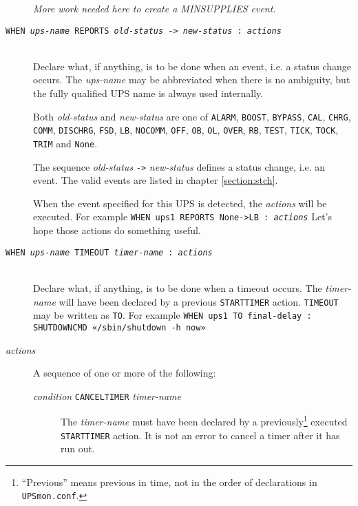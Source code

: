 \documentclass[12pt]{article}
\newcommand{\UPSmonconf}{\textcolor{UPSMONCOLOUR}{\texttt{UPSmon.conf}}}
\begin{document}
\begin{description}
\textit{More work needed here to create a MINSUPPLIES event.}

\item[\texttt{WHEN \textit{ups-name} REPORTS \textit{old-status} ->
    \textit{new-status} : \textit{actions}}] \ \\ Declare what, if anything,
  is to be done when an event, i.e. a status change occurs.  The
  \textit{ups-name} may be abbreviated when there is no ambiguity, but the
  fully qualified UPS name is always used internally.

  Both \textit{old-status} and \textit{new-status} are one of
  \texttt{ALARM}, \texttt{BOOST}, \texttt{BYPASS}, \texttt{CAL},
  \texttt{CHRG}, \texttt{COMM}, \texttt{DISCHRG}, \texttt{FSD}, \texttt{LB},
  \texttt{NOCOMM}, \texttt{OFF}, \texttt{OB}, \texttt{OL}, \texttt{OVER},
  \texttt{RB}, \texttt{TEST}, \texttt{TICK}, \texttt{TOCK}, \texttt{TRIM} and
  \texttt{None}.  

  The sequence \textit{old-status} \texttt{->} \textit{new-status} defines a
  status change, i.e. an event.  The valid events are listed in chapter
  \ref{section:stch}.

  When the event specified for this UPS is detected, the \textit{actions} will
  be executed.  For example \texttt{WHEN ups1 REPORTS None->LB :
    \textit{actions}} Let's hope those actions do something useful.

\item[\texttt{WHEN \textit{ups-name} TIMEOUT \textit{timer-name} :
    \textit{actions}}] \ \\ Declare what, if anything, is to be done when a
  timeout occurs.  The \textit{timer-name} will have been declared by a
  previous \texttt{STARTTIMER} action.  \texttt{TIMEOUT} may be written as
  \texttt{TO}. For example \texttt{WHEN ups1 TO final-delay : SHUTDOWNCMD
    «/sbin/shutdown -h now»}

\item[\textit{actions}] \hspace{7mm} A sequence of one or more of the following:

\begin{description}

\item[\textit{condition} \texttt{CANCELTIMER}
  \textit{timer-name}] \hspace{7mm} The \textit{timer-name} must have been
  declared by a previously\footnote{``Previous'' means previous in time, not
    in the order of declarations in \UPSmonconf.}  executed \texttt{STARTTIMER}
  action.  It is not an error to cancel a timer after it has run out.


\end{description}
\end{description}
\end{document}
